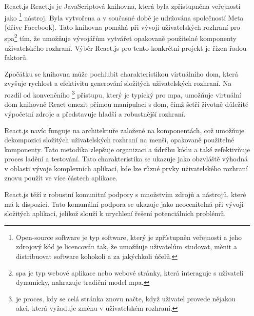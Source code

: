 \begin{subsection}{React.js}
    \label{subsec:implementace-technologie-react}
    React.js je JavaScriptová knihovna, která byla zpřístupněna veřejnosti jako \footnote{
        Open-source software je typ software, který je zpřístupněn veřejnosti a jeho zdrojový kód je licencován tak, že umožňuje uživatelům studovat, měnit a distribuovat software kohokoli a za jakýchkoli účelů\cite{rh_open_source_what_is_open_source}.
    } nástroj.
    Byla vytvořena a v současné době je udržována společností Meta (dříve Facebook).
    Tato knihovna pomáhá při vývoji uživatelských rozhraní pro \ac{spa}\footnote{
        \ac{spa} je typ webové aplikace nebo webové stránky, která interaguje s uživateli dynamicky, nahrazuje tradiční model \ac{mpa}\cite{w_blog_spa_vs_mpa}.
    } tím, že umožňuje vývojářům vytvářet opakovaně použitelné komponenty uživatelského rozhraní\cite{fos_projects_react}.
    Výběr React.js pro tento konkrétní projekt je řízen řadou faktorů.

    Zpočátku se knihovna může pochlubit charakteristikou virtuálního \ac{dom}, která zvyšuje rychlost a efektivitu generování složitých uživatelských rozhraní.
    Na rozdíl od konvenčního \footnote{ je proces, kdy se celá stránka znovu načte, když uživatel provede nějakou akci, která vyžaduje změnu v uživatelském rozhraní.}
    přístupu, který je typický pro \ac{mpa}, umožňuje virtuální \ac{dom} knihovně React omezit přímou manipulaci s \ac{dom}, čímž šetří životně důležité výpočetní zdroje a představuje hladší a robustnější rozhraní\cite{r_docs_faq_internals_what_is_the_virtual_dom}.

    React.js navíc funguje na architektuře založené na komponentách, což umožňuje dekompozici složitých uživatelských rozhraní na menší, opakovaně použitelné komponenty.
    Tato metodika zlepšuje organizaci a údržbu kódu a také zefektivňuje proces ladění a testování\cite{r_learn_describing_the_ui}.
    Tato charakteristika se ukazuje jako obzvláště výhodná v oblasti vývoje komplexních aplikací, kde lze různé prvky uživatelského rozhraní znovu použít ve více částech aplikace.

    React.js těží z robustní komunitní podpory s množstvím zdrojů a nástrojů, které má k dispozici.
    Tato komunální podpora se ukazuje jako neocenitelná při vývoji složitých aplikací, jelikož slouží k urychlení řešení potenciálních problémů.
\end{subsection}

